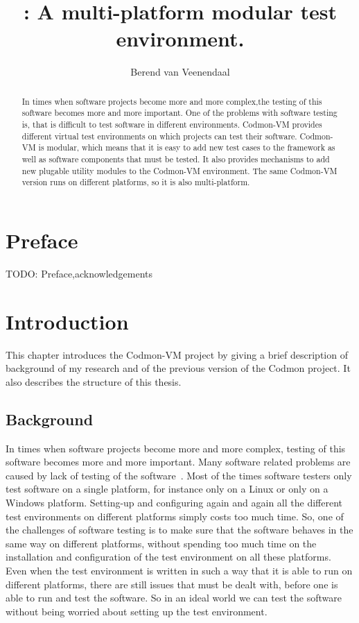 \documentclass{article}
\title{\project{}: A multi-platform modular test environment.}
\author{Berend van Veenendaal}
\newcommand{\project}{Codmon-VM}
\begin{document}
\maketitle

\begin{abstract}
In times when software projects become more and more complex,the testing of this software becomes more and more important. One of the problems with software testing is, that is difficult to test software in 
different environments. \project{} provides different virtual test environments on which projects can test their software. \project{} is modular, which means that it is easy to add new test cases to the framework 
as well as software components that must be tested. It also provides mechanisms to add new plugable utility modules to the \project{} environment. The same \project{} version runs on different platforms, so it 
is also multi-platform.
\end{abstract}
\newpage
\section*{Preface}
\label{sec:Preface}
TODO: Preface,acknowledgements
\newpage
\tableofcontents
\newpage

\section{Introduction}
\label{sec:Introduction}
This chapter introduces the \project{} project by giving a brief description of background of my research and of the
previous version of the Codmon project. It also describes the structure of this thesis.

\subsection{Background}
\label{sec:Background}
In times when software projects become more and more complex, testing of this software becomes more and more important. Many software related problems are caused by lack of testing of the 
software~\cite{TTCST}. Most of the times software testers only test software on a single platform, for instance only on a Linux or only on a Windows platform. Setting-up and configuring again and again all 
the different test environments on different platforms simply costs too much time. So, one of the challenges of software testing is to make sure that the software behaves in the same way on 
different platforms, without spending too much time on the installation and configuration of the test environment on all these platforms. Even when the test environment is written in such a way 
that it is able to run on different platforms, there are still issues that must be dealt with, before one is able to run and test the software. So in an ideal world we can test the software without being 
worried about setting up the test environment. 
\end{document}
